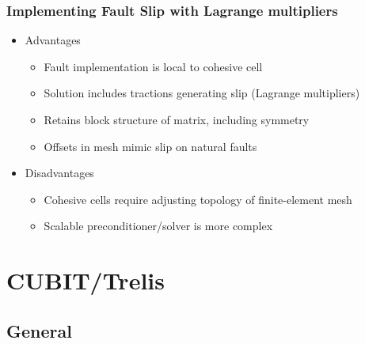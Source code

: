 \documentclass[aspectratio=169]{beamer}
\begin{document}
\begin{frame}
  \frametitle{Implementing Fault Slip with Lagrange multipliers}
 
 \begin{itemize}
 \item Advantages
   \begin{itemize}
   \item Fault implementation is local to cohesive cell
   \item Solution includes tractions generating slip (Lagrange multipliers)
   \item Retains block structure of matrix, including symmetry
   \item Offsets in mesh mimic slip on natural faults
   \end{itemize}
 \item Disadvantages 
   \begin{itemize}
   \item Cohesive cells require adjusting topology of finite-element
     mesh
   \item Scalable preconditioner/solver is more complex
  \end{itemize}
 \end{itemize}
  
\end{frame}



\section{CUBIT/Trelis}
\subsection{General}
\end{document}
